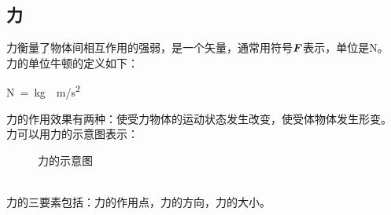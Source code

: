 \documentclass[UTF8]{ctexart}
\newcommand*{\veb}[1]{\vb*{#1}}
\begin{document}
\subsection{力}
    力衡量了物体间相互作用的强弱，是一个矢量，通常用符号$\veb{F}$表示，单位是\si{N}。\\[3mm]
    力的单位牛顿的定义如下：
    \begin{large}
        \begin{center}
            \si{N=kg\cdot m/s^2}\\[6mm]
        \end{center}
    \end{large}
    力的作用效果有两种：使受力物体的运动状态发生改变，使受体物体发生形变。\\[3mm]
    力可以用力的示意图表示：
    \begin{figure}[h]
        \begin{center}
            \caption{力的示意图}
        \end{center}
    \end{figure}\\
    力的三要素包括：力的作用点，力的方向，力的大小。

\newpage
\end{document}
